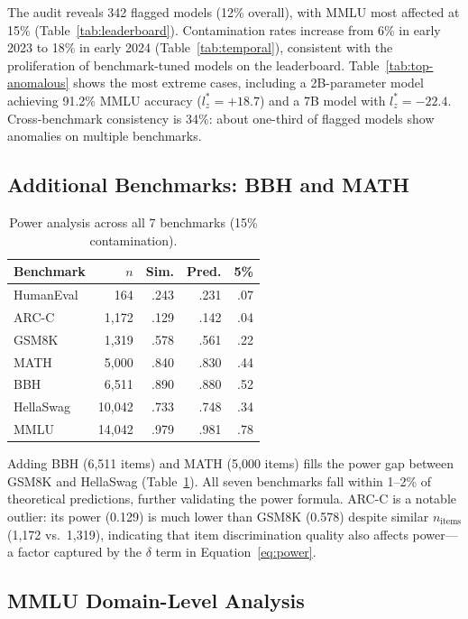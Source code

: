 \documentclass[11pt,a4paper]{article}
\begin{document}
The audit reveals 342 flagged models (12\% overall), with MMLU most affected at 15\% (Table~\ref{tab:leaderboard}). Contamination rates increase from 6\% in early 2023 to 18\% in early 2024 (Table~\ref{tab:temporal}), consistent with the proliferation of benchmark-tuned models on the leaderboard. Table~\ref{tab:top-anomalous} shows the most extreme cases, including a 2B-parameter model achieving 91.2\% MMLU accuracy ($l_z^*=+18.7$) and a 7B model with $l_z^*=-22.4$. Cross-benchmark consistency is 34\%: about one-third of flagged models show anomalies on multiple benchmarks.

\subsection{Additional Benchmarks: BBH and MATH}
\label{sec:extra-bench}

\begin{table}[t]
\centering
\caption{Power analysis across all 7 benchmarks (15\% contamination).}
\label{tab:power-all}
\small
\begin{tabular}{lrrrr}
\toprule
\textbf{Benchmark} & $n$ & \textbf{Sim.} & \textbf{Pred.} & \textbf{5\%} \\
\midrule
HumanEval & 164 & .243 & .231 & .07 \\
ARC-C & 1{,}172 & .129 & .142 & .04 \\
GSM8K & 1{,}319 & .578 & .561 & .22 \\
MATH & 5{,}000 & .840 & .830 & .44 \\
BBH & 6{,}511 & .890 & .880 & .52 \\
HellaSwag & 10{,}042 & .733 & .748 & .34 \\
MMLU & 14{,}042 & .979 & .981 & .78 \\
\bottomrule
\end{tabular}
\end{table}

Adding BBH (6{,}511 items) and MATH (5{,}000 items) fills the power gap between GSM8K and HellaSwag (Table~\ref{tab:power-all}). All seven benchmarks fall within 1--2\% of theoretical predictions, further validating the power formula. ARC-C is a notable outlier: its power (0.129) is much lower than GSM8K (0.578) despite similar $n_{\text{items}}$ (1{,}172 vs.\ 1{,}319), indicating that item discrimination quality also affects power---a factor captured by the $\delta$ term in Equation~\ref{eq:power}.

\subsection{MMLU Domain-Level Analysis}
\label{sec:domain}
\end{document}
